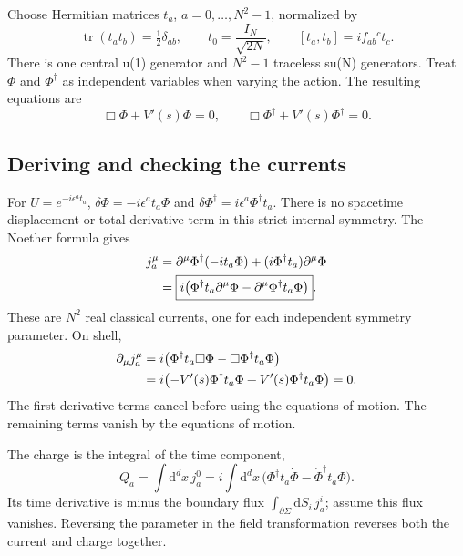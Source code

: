 \documentclass[11pt]{article}
\newcommand{\dd}{\mathrm{d}}
\newcommand{\tr}{\operatorname{tr}}
\begin{document}
Choose Hermitian matrices \(t_a\), \(a=0,\ldots,N^2-1\), normalized by
\begin{equation}
 \tr(t_at_b)=\tfrac12\delta_{ab},\qquad
 t_0=\frac{I_N}{\sqrt{2N}},\qquad [t_a,t_b]=if_{ab}{}^ct_c.
 \label{eq:uN-basis}
\end{equation}
There is one central u(1) generator and \(N^2-1\) traceless su(N)
generators. Treat \(\Phi\) and \(\Phi^\dagger\) as independent variables
when varying the action. The resulting equations are
\begin{equation}
 \Box\Phi+V'(s)\Phi=0,\qquad
 \Box\Phi^\dagger+V'(s)\Phi^\dagger=0.
 \label{eq:multiplet-eom}
\end{equation}

\subsection{Deriving and checking the currents}
For \(U=e^{-i\epsilon^at_a}\),
\(\delta\Phi=-i\epsilon^at_a\Phi\) and
\(\delta\Phi^\dagger=i\epsilon^a\Phi^\dagger t_a\).
There is no spacetime displacement or total-derivative term in this
strict internal symmetry. The Noether formula gives
\begin{align}
 j_a^\mu
 &=\partial^\mu\Phi^\dagger(-it_a\Phi)
   +(i\Phi^\dagger t_a)\partial^\mu\Phi\notag\\
 &=\boxed{i\bigl(\Phi^\dagger t_a\partial^\mu\Phi
       -\partial^\mu\Phi^\dagger t_a\Phi\bigr)}.
 \label{eq:noether-current}
\end{align}
These are \(N^2\) real classical currents, one for each independent
symmetry parameter.
On shell,
\begin{align}
 \partial_\mu j_a^\mu
 &=i\bigl(\Phi^\dagger t_a\Box\Phi
     -\Box\Phi^\dagger t_a\Phi\bigr)\notag\\
 &=i\bigl(-V'(s)\Phi^\dagger t_a\Phi
          +V'(s)\Phi^\dagger t_a\Phi\bigr)=0.
 \label{eq:current-divergence}
\end{align}
The first-derivative terms cancel before using the equations of motion.
The remaining terms vanish by the equations of motion.

The charge is the integral of the time component,
\begin{equation}
 Q_a=\int\dd^dx\,j_a^0
 =i\int\dd^dx\,
 \bigl(\Phi^\dagger t_a\dot\Phi
       -\dot\Phi^\dagger t_a\Phi\bigr).
 \label{eq:noether-charge}
\end{equation}
Its time derivative is minus the boundary flux
\(\int_{\partial\Sigma}\dd S_i\,j_a^i\); assume this flux vanishes.
Reversing the parameter in the field transformation reverses both the
current and charge together.
\end{document}

